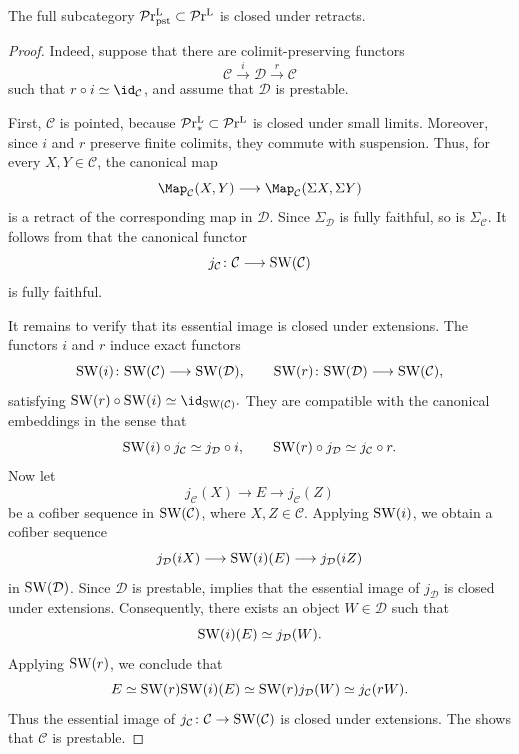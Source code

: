 \documentclass[a4paper,10pt, oneside]{amsart}
\begin{document}
\begin{prop}\label{retractpst}
	The full subcategory $\mathcal{P}\mathrm{r}^\mathrm{L}_{\mathrm{pst}}\subset\mathcal{P}\mathrm{r}^\mathrm{L}$ is closed under retracts.
\end{prop}
	\begin{proof}
		
		
		Indeed, suppose that there are colimit-preserving functors
		\[
		\mathcal C
		\xrightarrow{i}
		\mathcal D
		\xrightarrow{r}
		\mathcal C
		\]
		such that \(r\circ i\simeq \id_{\mathcal C}\), and assume that
		\(\mathcal D\) is prestable. 
		
		First, \(\mathcal C\) is pointed, because $\mathcal{P}\mathrm{r}^\mathrm{L}_*\subset \mathcal{P}\mathrm{r}^\mathrm{L}$ is closed under small limits.
		Moreover, since \(i\) and \(r\) preserve finite colimits, they commute with
		suspension. Thus, for every \(X,Y\in\mathcal C\), the canonical map
		\[
		\Map_{\mathcal C}(X,Y)
		\longrightarrow
		\Map_{\mathcal C}(\Sigma X,\Sigma Y)
		\]
		is a retract of the corresponding map in \(\mathcal D\). Since
		\(\Sigma_{\mathcal D}\) is fully faithful, so is
		\(\Sigma_{\mathcal C}\). It follows from
		\cite[Proposition~C.1.2.2]{sag} that the canonical functor
		\[
		j_{\mathcal C}\colon
		\mathcal C\longrightarrow \mathrm{SW}(\mathcal C)
		\]
		is fully faithful.
		
		It remains to verify that its essential image is closed under extensions.
		The functors \(i\) and \(r\) induce exact functors
		\[
		\mathrm{SW}(i)\colon\mathrm{SW}(\mathcal C)\longrightarrow\mathrm{SW}(\mathcal D),
		\qquad
		\mathrm{SW}(r)\colon\mathrm{SW}(\mathcal D)\longrightarrow\mathrm{SW}(\mathcal C),
		\]
		satisfying
		$
		\op{SW}(r)\circ\op{SW}(i)\simeq\id_{\op{SW}(\mathcal C)}.
		$
		They are compatible with the canonical embeddings in the sense that
		\[
		\mathrm{SW}(i)\circ j_{\mathcal C}\simeq j_{\mathcal D}\circ i,
		\qquad
		\mathrm{SW}(r)\circ j_{\mathcal D}\simeq j_{\mathcal C}\circ r.
		\]
		Now let
		\[
		j_{\mathcal C}(X)\longrightarrow E\longrightarrow j_{\mathcal C}(Z)
		\]
		be a cofiber sequence in \(\mathrm{SW}(\mathcal C)\), where \(X,Z\in\mathcal C\).
		Applying \(\mathrm{SW}(i)\), we obtain a cofiber sequence
		\[
		j_{\mathcal D}(iX)
		\longrightarrow
		\mathrm{SW}(i)(E)
		\longrightarrow
		j_{\mathcal D}(iZ)
		\]
		in \(\mathrm{SW}(\mathcal D)\). Since \(\mathcal D\) is prestable,
		\cite[Proposition~C.1.2.2]{sag} implies that the essential image of
		\(j_{\mathcal D}\) is closed under extensions. Consequently, there exists
		an object \(W\in\mathcal D\) such that
		\[
		\mathrm{SW}(i)(E)\simeq j_{\mathcal D}(W).
		\]
		Applying \(\mathrm{SW}(r)\), we conclude that
		\[
		E
		\simeq
		\mathrm{SW}(r)\mathrm{SW}(i)(E)
		\simeq
		\mathrm{SW}(r)j_{\mathcal D}(W)
		\simeq
		j_{\mathcal C}(rW).
		\]
		Thus the essential image of
		\(j_{\mathcal C}\colon\mathcal C\to\mathrm{SW}(\mathcal C)\) is closed under
		extensions. The
		\cite[Proposition~C.1.2.2]{sag} shows that \(\mathcal C\) is prestable.
	\end{proof}
\end{document}
